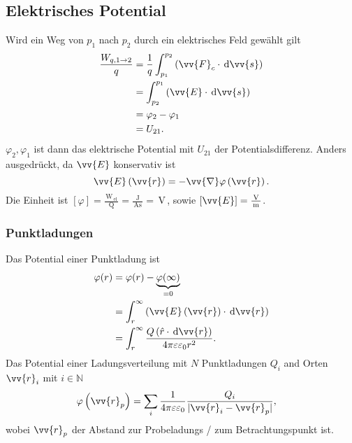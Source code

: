 \documentclass[a4paper,12pt]{article}
\newcommand{\td}{\,\text{d}}
\begin{document}
\subsection{Elektrisches Potential}
Wird ein Weg von $p_1$ nach $p_2$ durch ein elektrisches Feld gewählt gilt
\begin{align*}
        \dfrac{W_{q,1\rightarrow 2}}{q}&=\dfrac{1}{q}\int_{p_1}^{p_2}\left(\vv{F}_c\cdot \td \vv{s}\right)\\
                                       &=\int_{p_2}^{p_1}\left(\vv{E}\cdot \td \vv{s}\right)\\
                                       &=\varphi _2-\varphi _1\\
                                       &=U_{21}
.\end{align*}
$\varphi _2,\varphi _1$ ist dann das elektrische Potential mit $U_{21}$ der Potentialsdifferenz. Anders ausgedrückt, da $\vv{E}$ konservativ ist
\[ 
        \vv{E}\left(\vv{r}\right)=-\vv{\nabla }\varphi \left(\vv{r}\right)
.\] 
Die Einheit ist $[\varphi ]=\tfrac{\,\text{W}_{\,\text{el}\,}}{\,\text{Q}\,}=\tfrac{\,\text{J}\,}{\,\text{As}\,}=\,\text{V}\,$, sowie $[\vv{E}]=\tfrac{\,\text{V}\,}{\,\text{m}\,}$.

\subsubsection{Punktladungen}
Das Potential einer Punktladung ist
\begin{align*}
        \varphi (r)&=\varphi (r)-\underbrace{\varphi (\infty)}_{=0}\\
                   &=\int_{r}^{\infty}\left(\vv{E}\left(\vv{r}\right)\cdot \td \vv{r}\right)\\
                   &=\int_{r}^{\infty}\dfrac{Q\left(\hat{r}\cdot \td \vv{r}\right)}{4\pi \varepsilon \varepsilon _0r^2}
.\end{align*}
Das Potential einer Ladungsverteilung mit $N$ Punktladungen $Q_i$ and Orten $\vv{r}_i$ mit $i \in \mathbb{N}$ 
\begin{align*}
        \varphi \left(\vv{r}_p\right)&=\sum_{i}^{}\dfrac{1}{4\pi \varepsilon \varepsilon _0}\dfrac{Q_i}{|\vv{r}_i-\vv{r}_p|}
,\end{align*}
wobei $\vv{r}_p$ der Abstand zur Probeladungs / zum Betrachtungspunkt ist.
\end{document}
